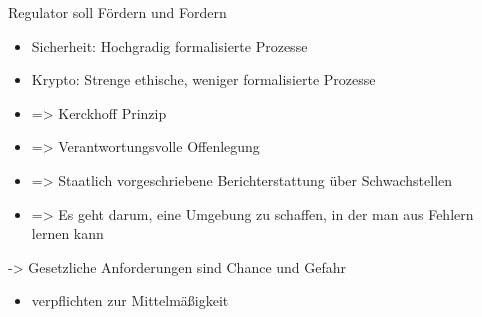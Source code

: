 \begin{frame}{Regulator soll Fördern und Fordern}
  \begin{itemize}
    \item  Sicherheit: Hochgradig formalisierte Prozesse
    \item  Krypto: Strenge ethische, weniger formalisierte Prozesse 
    \item  => Kerckhoff Prinzip
    \item  => Verantwortungsvolle Offenlegung
    \item  => Staatlich vorgeschriebene Berichterstattung über Schwachstellen
    \item  => Es geht darum, eine Umgebung zu schaffen, in der man aus Fehlern lernen kann
  \end{itemize}
    \item -> Gesetzliche Anforderungen sind Chance und Gefahr
    \begin{itemize}
      \item verpflichten zur Mittelmäßigkeit
    \end{itemize}
\end{frame}
